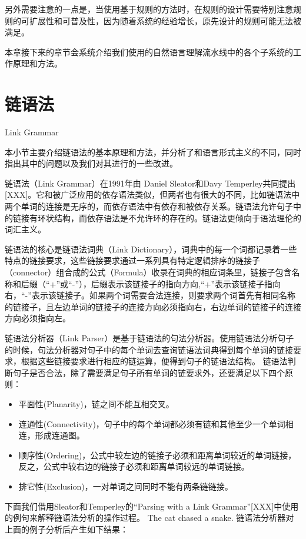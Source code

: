 另外需要注意的一点是，当使用基于规则的方法时，在规则的设计需要特别注意规则的可扩展性和可普及性，因为随着系统的经验增长，原先设计的规则可能无法被满足。

本章接下来的章节会系统介绍我们使用的自然语言理解流水线中的各个子系统的工作原理和方法。

\section{链语法}{Link Grammar}

本小节主要介绍链语法的基本原理和方法，并分析了和语言形式主义的不同，同时指出其中的问题以及我们对其进行的一些改进。

链语法（Link Grammar）在1991年由 Daniel Sleator和Davy Temperley共同提出[XXX]。它和被广泛应用的依存语法类似，但两者也有很大的不同，比如链语法中两个单词的连接是无序的，而依存语法中有依存和被依存关系。链语法允许句子中的链接有环状结构，而依存语法是不允许环的存在的。链语法更倾向于语法理伦的词汇主义。

链语法的核心是链语法词典（Link Dictionary），词典中的每一个词都记录着一些特点的链接要求，这些链接要求通过一系列具有特定逻辑排序的链接子（connector）组合成的公式（Formula）收录在词典的相应词条里，链接子包含名称和后缀（“+”或“-”），后缀表示该链接子的指向方向,“+”表示该链接子指向右，“-”表示该链接子。如果两个词需要合法连接，则要求两个词首先有相同名称的链接子，且左边单词的链接子的连接方向必须指向右，右边单词的链接子的连接方向必须指向左。

链语法分析器（Link Parser）是基于链语法的句法分析器。使用链语法分析句子的时候，句法分析器对句子中的每个单词去查询链语法词典得到每个单词的链接要求，根据这些链接要求进行相应的链运算，便得到句子的链语法结构。 链语法判断句子是否合法，除了需要满足句子所有单词的链要求外，还要满足以下四个原则：

\begin{itemize}
\item 平面性(Planarity)，链之间不能互相交叉。
\item 连通性(Connectivity)，句子中的每个单词都必须有链和其他至少一个单词相连，形成连通图。
\item 顺序性(Ordering)，公式中较左边的链接子必须和距离单词较近的单词链接，反之，公式中较右边的链接子必须和距离单词较远的单词链接。
\item 排它性(Exclusion)，一对单词之间同时不能有两条链链接。
\end{itemize}

下面我们借用Sleator和Temperley的“Parsing with a Link Grammar”[XXX]中使用的例句来解释链语法分析的操作过程。
The cat chased a snake.
链语法分析器对上面的例子分析后产生如下结果：
 
